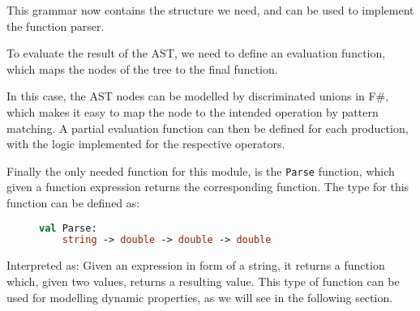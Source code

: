 This grammar now contains the structure we need, and can be used to implement the function parser.

To evaluate the result of the AST, we need to define an evaluation function, which maps the nodes of the tree to the final function.

In this case, the AST nodes can be modelled by discriminated unions in F\#, which makes it easy to map the node to the intended operation by pattern matching. A partial evaluation function can then be defined for each production, with the logic implemented for the respective operators.

Finally the only needed function for this module, is the \texttt{Parse} function, which given a function expression returns the corresponding function. The type for this function can be defined as:
\begin{figure}[H]
\begin{lstlisting}[language=FSharp]
val Parse: 
    string -> double -> double -> double
\end{lstlisting}
\end{figure}

Interpreted as: Given an expression in form of a string, it returns a function which, given two values, returns a resulting value. This type of function can be used for modelling dynamic properties, as we will see in the following section.